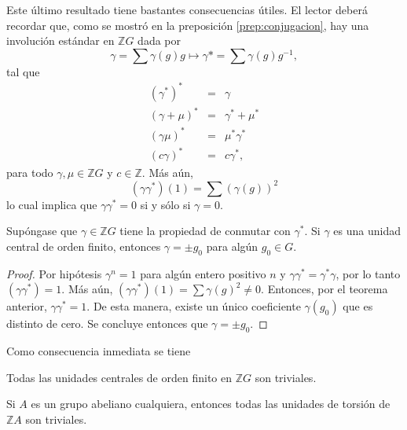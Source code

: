 Este último resultado tiene bastantes consecuencias útiles. El lector deberá recordar que, como se mostró en la preposición \ref{prep:conjugacion}, hay una involución estándar en $\mathds{Z}G$ dada por 
\begin{equation*}
\gamma = \sum\gamma(g)g \mapsto \gamma* = \sum\gamma(g)g^{-1},
\end{equation*}
tal que
\begin{eqnarray*}
(\gamma^*)^* &=& \gamma \\
(\gamma + \mu)^* &=& \gamma^* + \mu^*\\
(\gamma\mu)^* &=& \mu^*\gamma^*\\
(c\gamma)^* &=& c\gamma^*,
\end{eqnarray*}
para todo $\gamma, \mu \in \mathds{Z}G$ y $c \in \mathds{Z}$. Más aún, 
\begin{equation*}
(\gamma\gamma^*)(1) = \sum(\gamma(g))^2
\end{equation*}
lo cual implica que $\gamma\gamma^* = 0 $ si y sólo si $\gamma = 0$.

\begin{corolario}
Supóngase que $\gamma \in \mathds{Z}G$ tiene la propiedad de conmutar con $\gamma^*$. Si $\gamma$ es una unidad central de orden finito, entonces $\gamma = \pm g_0$ para algún $g_0 \in G$.
\end{corolario}
\begin{proof}
Por hipótesis $\gamma^n = 1$ para algún entero positivo $n$ y $\gamma\gamma^* = \gamma^*\gamma$, por lo tanto $(\gamma\gamma^*) = 1$. Más aún, $(\gamma\gamma^*)(1) = \sum \gamma(g)^2 \neq 0$. Entonces, por el teorema anterior, $\gamma\gamma^* = 1$. De esta manera, existe un único coeficiente $\gamma(g_0)$ que es distinto de cero. Se concluye entonces que $\gamma = \pm g_0$. 
\end{proof}
Como consecuencia inmediata se tiene 
\begin{corolario}
Todas las unidades centrales de orden finito en $\mathds{Z}G$ son triviales.
\end{corolario}
\begin{corolario}
Si $A$ es un grupo abeliano cualquiera, entonces todas las unidades de torsión de $\mathds{Z}A$ son triviales.
\end{corolario}


